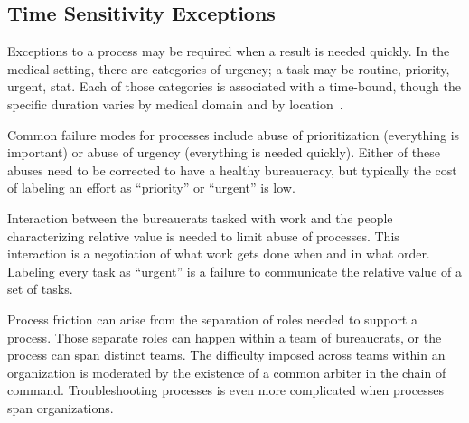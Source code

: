 \subsection*{Time Sensitivity Exceptions}
Exceptions to a process may be required when a result is needed quickly. In the medical setting, there are categories of urgency; a task may be routine, priority, urgent, stat. 
Each of those categories is associated with a time-bound, though the specific duration varies by medical domain and by location~\cite{2022_priority_definitions, 2018_order_priority}.


Common failure modes for processes include abuse of prioritization (everything is important) or abuse of urgency (everything is needed quickly). Either of these abuses need to be corrected to have a healthy bureaucracy, but typically the cost of labeling an effort as ``priority'' or ``urgent'' is low. 

Interaction between the bureaucrats tasked with work and the people characterizing relative value is needed to limit abuse of processes. This interaction is a negotiation of what work gets done when and in what order. Labeling every task as ``urgent'' is a failure to communicate the relative value of a set of tasks.


Process friction can arise from the separation of roles needed to support a process. Those separate roles can happen within a team of bureaucrats, or the process can span distinct teams. The difficulty imposed across teams within an organization is moderated by the existence of a common arbiter in the chain of command.  
Troubleshooting processes is even more complicated when processes span organizations.  